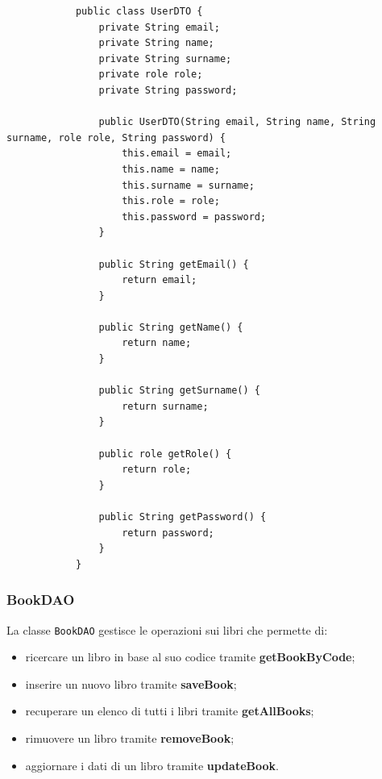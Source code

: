     \begin{listing}[H]
        \begin{verbatim}
            public class UserDTO {
                private String email;
                private String name;
                private String surname;
                private role role;
                private String password;
            
                public UserDTO(String email, String name, String surname, role role, String password) {
                    this.email = email;
                    this.name = name;
                    this.surname = surname;
                    this.role = role;
                    this.password = password;
                }
            
                public String getEmail() {
                    return email;
                }
            
                public String getName() {
                    return name;
                }
            
                public String getSurname() {
                    return surname;
                }
            
                public role getRole() {
                    return role;
                }
            
                public String getPassword() {
                    return password;
                }
            }
        \end{verbatim}
        \caption{Implementazione della classe \texttt{UserDTO}}
        \label{lst:userDTO}
    \end{listing}

    \subsubsection{BookDAO} 
    La classe \texttt{BookDAO} gestisce le operazioni sui libri che permette di:
    \begin{itemize}
        \item ricercare un libro in base al suo codice tramite \textbf{getBookByCode};
        \item inserire un nuovo libro tramite \textbf{saveBook};
        \item recuperare un elenco di tutti i libri tramite \textbf{getAllBooks};
        \item rimuovere un libro tramite \textbf{removeBook};
        \item aggiornare i dati di un libro tramite \textbf{updateBook}.
    \end{itemize}

